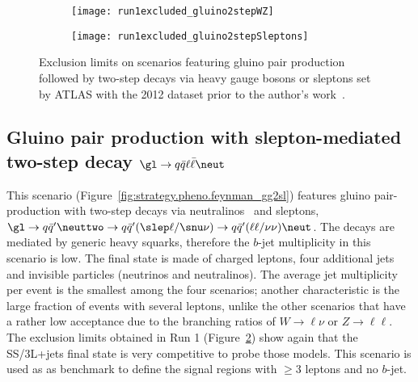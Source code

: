 \begin{figure}[t]
\centering
\begin{subfigure}[t]{0.49\textwidth}\texttt{[image: run1excluded\_gluino2stepWZ]}\caption{}\label{fig:strategy.pheno.run1excluded_gluino2stepWZ}\end{subfigure} 
\begin{subfigure}[t]{0.49\textwidth}\texttt{[image: run1excluded\_gluino2stepSleptons]}\caption{}\label{fig:strategy.pheno.run1excluded_gluino2stepSleptons}\end{subfigure}
\caption{Exclusion limits on scenarios featuring gluino pair production followed by two-step decays via heavy gauge bosons or sleptons 
set by ATLAS with the 2012 dataset prior to the author's work~\cite{SUSY-2014-06}.}
\label{fig:strategy.pheno.run1excluded_1stgen}
\end{figure}

\subsection*{Gluino pair production with slepton-mediated two-step decay $\gl\to q\bar q\ell\bar\ell\neut$}
\label{subsec:signals_g2slep}

This scenario (Figure~\ref{fig:strategy.pheno.feynman_gg2sl}) features gluino pair-production with two-step decays via neutralinos \neuttwo\ and sleptons, 
$\gl\to q\bar{q}'\neuttwo \to q\bar{q}'(\slep\ell/\snu\nu) \to q\bar{q}'(\ell\ell/\nu\nu)\neut$. 
The decays are mediated by generic heavy squarks, therefore the $b$-jet multiplicity in this scenario is low. 
The final state is made of charged leptons, four additional jets and invisible particles (neutrinos and neutralinos). 
The average jet multiplicity per event is the smallest among the four scenarios;  
another characteristic is the large fraction of events with several leptons, 
unlike the other scenarios that have a rather low acceptance due to the branching ratios of $W\to\ell\nu$ or $Z\to\ell\ell$. 
The exclusion limits obtained in Run 1 (Figure~\ref{fig:strategy.pheno.run1excluded_gluino2stepSleptons}) show again that the SS/3L+jets final state 
is very competitive to probe those models. 
This scenario is used as as benchmark to define the signal regions with $\ge 3$ leptons and no $b$-jet. 

